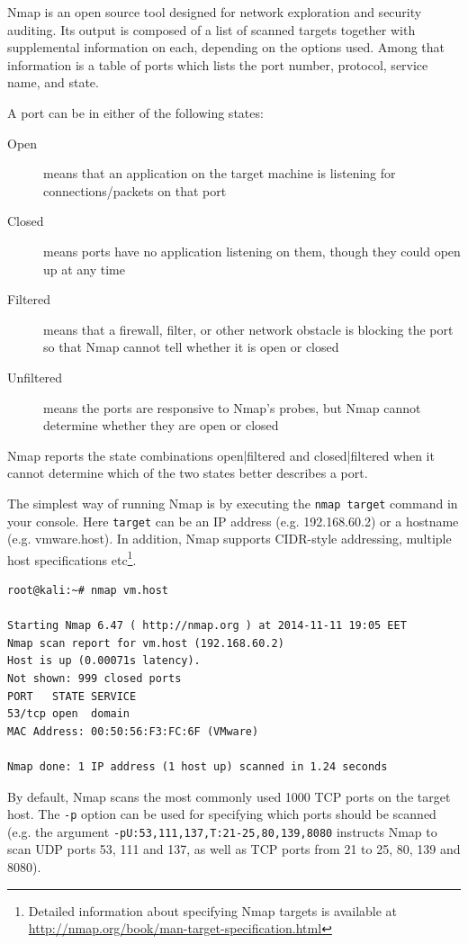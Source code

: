 \documentclass[a4paper,oneside,12pt]{book}
\begin{document}
Nmap is an open source tool designed for network exploration and security auditing. Its output is composed of a list of scanned targets together with supplemental information on each, depending on the options used. Among that information is a table of ports which lists the port number, protocol, service name, and state. 

A port can be in either of the following states:
\begin{description}
\item[Open] means that an application on the target machine is listening for connections/packets on that port
\item[Closed] means ports have no application listening on them, though they could open up at any time
\item[Filtered] means that a firewall, filter, or other network obstacle is blocking the port so that Nmap cannot tell whether it is open or closed
\item[Unfiltered] means the ports are responsive to Nmap's probes, but Nmap cannot determine whether they are open or closed
\end{description}

Nmap reports the state combinations open|filtered and closed|filtered when it cannot determine which of the two states better describes a port.

The simplest way of running Nmap is by executing the \texttt{nmap target} command in your console. Here \texttt{target} can be an IP address (e.g. 192.168.60.2) or a hostname (e.g. vmware.host). In addition, Nmap supports CIDR-style addressing, multiple host specifications etc\footnote{Detailed information about specifying Nmap targets is available at \url{http://nmap.org/book/man-target-specification.html}}.

\begin{lstlisting}[title=A Nmap scan with no options]
root@kali:~# nmap vm.host

Starting Nmap 6.47 ( http://nmap.org ) at 2014-11-11 19:05 EET
Nmap scan report for vm.host (192.168.60.2)
Host is up (0.00071s latency).
Not shown: 999 closed ports
PORT   STATE SERVICE
53/tcp open  domain
MAC Address: 00:50:56:F3:FC:6F (VMware)

Nmap done: 1 IP address (1 host up) scanned in 1.24 seconds
\end{lstlisting}

By default, Nmap scans the most commonly used 1000 TCP ports on the target host. The \texttt{-p} option can be used for specifying which ports should be scanned (e.g. the argument \texttt{-pU:53,111,137,T:21-25,80,139,8080} instructs Nmap to scan UDP ports 53, 111 and 137, as well as TCP ports from 21 to 25, 80, 139 and 8080).
\end{document}
